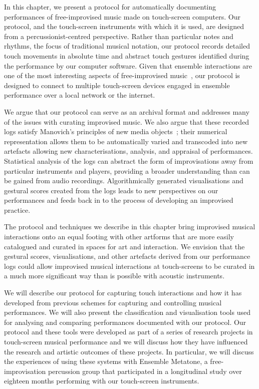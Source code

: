 \documentclass[graybox]{svmult}
\begin{document}
In this chapter, we present a protocol for automatically documenting
performances of free-improvised music made on touch-screen computers.
Our protocol, and the touch-screen instruments with which it is used,
are designed from a percussionist-centred perspective. Rather than
particular notes and rhythms, the focus of traditional musical
notation, our protocol records detailed touch movements in absolute
time and abstract touch gestures identified during the performance by
our computer software. Given that ensemble interactions are one of the
most interesting aspects of free-improvised music~\cite{Borgo:2006fv},
our protocol is designed to connect to multiple touch-screen devices
engaged in ensemble performance over a local network or the internet.

We argue that our protocol can serve as an archival format and
addresses many of the issues with curating improvised music. We also
argue that these recorded logs satisfy Manovich's principles of new
media objects~\cite{Manovich:2002ly}; their numerical representation
allows them to be automatically varied and transcoded into new
artefacts allowing new characterisations, analysis, and appraisal of
performances. Statistical analysis of the logs can abstract the form
of improvisations away from particular instruments and players,
providing a broader understanding than can be gained from audio
recordings. Algorithmically generated visualisations and gestural
scores created from the logs leads to new perspectives on our
performances and feeds back in to the process of developing an
improvised practice.

The protocol and techniques we describe in this chapter bring
improvised musical interactions onto an equal footing with other
artforms that are more easily catalogued and curated in spaces for art
and interaction. We envision that the gestural scores, visualisations,
and other artefacts derived from our performance logs could allow improvised
musical interactions at touch-screens to be curated in a much more significant way than
is possible with acoustic instruments.

We will describe our protocol for capturing touch interactions and how
it has developed from previous schemes for capturing and controlling
musical performances. We will also present the classification and
visualisation tools used for analysing and comparing performances
documented with our protocol. Our protocol and these tools were
developed as part of a series of research projects in touch-screen
musical performance and we will discuss how they have influenced the
research and artistic outcomes of these projects. In particular, we
will discuss the experiences of using these systems with Ensemble
Metatone, a free-improvisation percussion group that participated in a
longitudinal study over eighteen months performing with our
touch-screen instruments.
\end{document}

